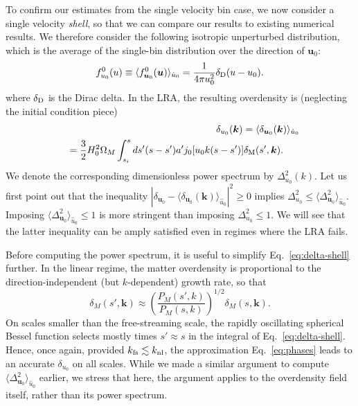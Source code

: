 \documentclass[useAMS, usenatbib]{mnras}
\newcommand{\beq}{\begin{equation}}
\newcommand{\eeq}{\end{equation}}
\newcommand{\barr}{\begin{eqnarray}}
\newcommand{\earr}{\end{eqnarray}}
\newcommand{\bs}{\boldsymbol}
\begin{document}
To confirm our estimates from the single velocity bin case, we now consider a single velocity \emph{shell}, so that we can compare our results to existing numerical results. We therefore consider the following isotropic unperturbed distribution, which is the average of the single-bin distribution over the direction of $\bs{u}_0$:
\beq
f^0_{u_0}(u) \equiv \langle f_{\bs{u}_0}^0 (\bs{u}) \rangle_{\hat{u}_0} = \frac1{4 \pi u_0^2} \delta_{\rm D}(u- u_0).
\eeq
where $\delta_{\rm D}$ is the Dirac delta. In the LRA, the resulting overdensity is (neglecting the initial condition piece)
\barr
&&\delta_{u_0}(\bs{k}) = \langle \delta_{\bs{u}_0}(\bs{k}) \rangle_{\hat{u}_0} \nonumber\\
&&= \frac32 H_0^2 \Omega_M \int_{s_i}^s ds' (s - s') a' j_0[u_0 k (s - s')] \delta_{\rm M}(s', \bs{k}).~~~~~ \label{eq:delta-shell}
\earr
We denote the corresponding dimensionless power spectrum by $\Delta^2_{u_0}(k)$. Let us first point out that the inequality $|\delta_{\bs{u}_0} - \langle \delta_{\bs{u}_0}(\bs{k}) \rangle_{\hat{u}_0}|^2 \geq 0$ implies $\Delta^2_{u_0} \leq \langle \Delta^2_{\bs{u}_0} \rangle_{\hat{u}_0}$. Imposing $\langle \Delta^2_{\bs{u}_0} \rangle_{\hat{u}_0} \leq 1$ is more stringent than imposing $\Delta^2_{u_0} \leq 1$. We will see that the latter inequality can be amply satisfied even in regimes where the LRA fails.

Before computing the power spectrum, it is useful to simplify Eq.~\eqref{eq:delta-shell} further. In the linear regime, the matter overdensity is proportional to the direction-independent (but $k$-dependent) growth rate, so that
\beq
\delta_M(s', \bs{k}) \approx \left(\frac{P_M(s', k)}{P_M(s, k)}\right)^{1/2} \delta_M(s, \bs{k}). \label{eq:phases}
\eeq
On scales smaller than the free-streaming scale, the rapidly oscillating spherical Bessel function selects mostly times $s' \approx s$ in the integral of Eq.~\eqref{eq:delta-shell}. Hence, once again, provided $k_{\rm fs} \lesssim k_{\rm nl}$, the approximation Eq.~\eqref{eq:phases} leads to an accurate $\delta_{u_0}$ on all scales. While we made a similar argument to compute $\langle \Delta^2_{\bs{u}_0} \rangle_{\hat{u}_0}$ earlier, we stress that here, the argument applies to the overdensity field itself, rather than its power spectrum.
\end{document}

